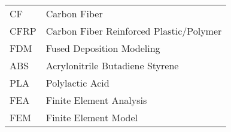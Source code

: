 
\begin{flushleft} 

\begin{tabular}{ll}

CF & Carbon Fiber\\
CFRP & Carbon Fiber Reinforced Plastic/Polymer\\
FDM & Fused Deposition Modeling\\
ABS & Acrylonitrile Butadiene Styrene\\
PLA & Polylactic Acid\\
FEA & Finite Element Analysis\\
FEM & Finite Element Model\\

\end{tabular}

\end{flushleft}


